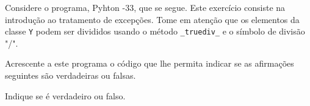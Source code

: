 \documentclass[12pt,varwidth=16cm,border=1pt]{standalone}
\begin{document}
Considere o programa, Pyhton -33, que se segue. Este exercício consiste na introdução ao tratamento de excepções. Tome em atenção que os elementos da classe \verb+Y+ podem ser divididos usando o método \verb+_truediv_+ e o símbolo de divisão "/".



Acrescente a este programa o código que lhe permita indicar se as
afirmações seguintes são verdadeiras ou falsas.

Indique se é verdadeiro ou falso.
\end{document}
